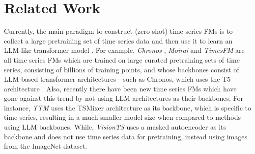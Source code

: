 \section{Related Work}
\label{sec:related_work}
Currently, the main paradigm to construct (zero-shot) time series FMs is to collect a large pretraining set of time series data and then use it to learn an LLM-like transformer model \citep{rasul2023lag,chen2024visionts,liang2024foundation}. For example, \textit{Chronos} \citep{Ansari2024Chronos}, \textit{Moirai} \citep{Woo2024moirai} and \textit{TimesFM} \citep{Das2024TimesFM} are all time series FMs which are trained on large curated pretraining sets of time series, consisting of billions of training points, and whose backbones consist of LLM-based transformer architectures---such as Chronos, which uses the T5 architecture \citep{roberts2019exploring}. Also, recently there have been new time series FMs which have gone against this trend by not using LLM architectures as their backbones. For instance, \textit{TTM} \citep{Ekambaram2024Tiny} uses the TSMixer architecture \cite{ekambaram2023tsmixer} as its backbone, which is specific to time series, resulting in a much smaller model size when compared to methods using LLM backbones. While, \textit{VisionTS} \citep{chen2024visionts} uses a masked autoencoder \citep{he2022masked} as its backbone and does not use time series data for pretraining, instead using images from the ImageNet dataset.


